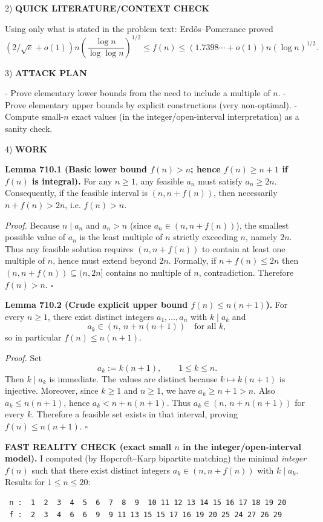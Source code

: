 2) \textbf{QUICK LITERATURE/CONTEXT CHECK}

Using only what is stated in the problem text: Erd\H{o}s--Pomerance proved
\[
(2/\sqrt{e}+o(1))n\left(\frac{\log n}{\log\log n}\right)^{1/2}\le f(n)\le (1.7398\cdots+o(1))n(\log n)^{1/2}.
\]

3) \textbf{ATTACK PLAN}

- Prove elementary lower bounds from the need to include a multiple of $n$.
- Prove elementary upper bounds by explicit constructions (very non-optimal).
- Compute small-$n$ exact values (in the integer/open-interval interpretation) as a sanity check.

4) \textbf{WORK}

\textbf{Lemma 710.1 (Basic lower bound $f(n)>n$; hence $f(n)\ge n+1$ if $f(n)$ is integral).}
For any $n\ge 1$, any feasible $a_n$ must satisfy $a_n\ge 2n$.
Consequently, if the feasible interval is $(n,n+f(n))$, then necessarily $n+f(n)>2n$, i.e. $f(n)>n$.

\textit{Proof.}
Because $n\mid a_n$ and $a_n>n$ (since $a_n\in(n,n+f(n))$), the smallest possible value of $a_n$ is the least multiple of $n$ strictly exceeding $n$, namely $2n$.
Thus any feasible solution requires $(n,n+f(n))$ to contain at least one multiple of $n$, hence must extend beyond $2n$.
Formally, if $n+f(n)\le 2n$ then $(n,n+f(n))\subseteq(n,2n]$ contains no multiple of $n$, contradiction.
Therefore $f(n)>n$.
\hfill$\square$

\textbf{Lemma 710.2 (Crude explicit upper bound $f(n)\le n(n+1)$).}
For every $n\ge 1$, there exist distinct integers $a_1,\dots,a_n$ with $k\mid a_k$ and
\[
a_k\in (n,\,n+n(n+1))\quad\text{for all }k,
\]
so in particular $f(n)\le n(n+1)$.

\textit{Proof.}
Set
\[
 a_k := k(n+1),\qquad 1\le k\le n.
\]
Then $k\mid a_k$ is immediate.
The values are distinct because $k\mapsto k(n+1)$ is injective.
Moreover, since $k\ge 1$ and $n\ge 1$, we have $a_k\ge n+1>n$.
Also $a_k\le n(n+1)$, hence $a_k < n + n(n+1)$.
Thus $a_k\in(n,\,n+n(n+1))$ for every $k$.
Therefore a feasible set exists in that interval, proving $f(n)\le n(n+1)$.
\hfill$\square$

\textbf{FAST REALITY CHECK (exact small $n$ in the integer/open-interval model).}
I computed (by Hopcroft--Karp bipartite matching) the minimal \emph{integer} $f(n)$ such that there exist distinct integers $a_k\in(n,n+f(n))$ with $k\mid a_k$.
Results for $1\le n\le 20$:
\begin{verbatim}
 n :  1  2  3  4  5  6  7  8  9  10 11 12 13 14 15 16 17 18 19 20
 f :  2  3  4  6  6  9  9 11 13 15 15 17 16 19 20 25 24 27 26 29
\end{verbatim}

